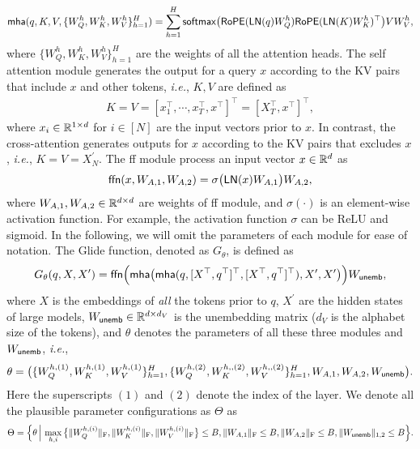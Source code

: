 \begin{align}
    \mathsf{mha}(q,K,V,\{W_Q^{h},W_K^{h},W_V^{h}\}_{h=1}^{H}) =  \sum_{h=1}^{H}\mathsf{softmax}\big(\mathsf{RoPE}(\mathsf{LN}(q) W_Q^{h}) \mathsf{RoPE}(\mathsf{LN}(K) W_K^{h})^{\top}\big)V W_{V}^{h},\label{eq:mha}
\end{align}
where $\{W_Q^{h},W_K^{h},W_V^{h}\}_{h=1}^{H}$ are the weights of all the attention heads. The self attention module generates the output for a query $x$ according to the KV pairs that include $x$ and other tokens, \emph{i.e.}, $K,V$ are defined as 
\begin{align*}
    K = V = [x_{1}^{\top},\cdots,x_{T}^{\top},x^{\top}]^{\top}=[X_{T}^{\top},x^{\top}]^{\top},
\end{align*}
where $x_{i}\in\mathbb{R}^{1\times d}$ for $i\in[N]$ are the input vectors prior to $x$. In contrast, the cross-attention generates outputs for $x$ according to the KV pairs that excludes $x$, \emph{i.e.}, $K=V=X_N^{\prime}$. The \ac{ff} module process an input vector $x\in\mathbb{R}^{d}$ as
\begin{align}
    \mathsf{ffn}(x,W_{A,1},W_{A,2})=\sigma\big(\mathsf{LN}(x)W_{A,1}\big)W_{A,2},
\end{align}
where $W_{A,1},W_{A,2}\in\mathbb{R}^{d\times d}$ are weights of \ac{ff} module, and $\sigma(\cdot)$ is an element-wise activation function. For example, the activation function $\sigma$ can be ReLU and sigmoid. In the following, we will omit the parameters of each module for ease of notation. The Glide function, denoted as $G_\theta$, is defined as
\begin{align}
    G_{\theta}(q,X,X^{\prime}) = \mathsf{ffn}\Big( \mathsf{mha}\big(\mathsf{mha}(q,[X^{\top},q^{\top}]^{\top}, [X^{\top},q^{\top}]^{\top}), X^{\prime},X^{\prime}\big)\Big)W_{\mathsf{unemb}},
\end{align}
where $X$ is the embeddings of \emph{all} the tokens prior to $q$, $X^{\prime}$ are the hidden states of large models, $W_{\mathsf{unemb}}\in\mathbb{R}^{d\times d_V}$ is the unembedding matrix ($d_V$ is the alphabet size of the tokens), and $\theta$ denotes the parameters of all these three modules and $W_{\mathsf{unemb}}$, \emph{i.e.},
\begin{align*}
    \theta= \big(\{W_Q^{h,(1)},W_K^{h,(1)},W_V^{h,(1)}\}_{h=1}^{H},\{W_Q^{h,(2)},W_K^{h,,(2)},W_V^{h,,(2)}\}_{h=1}^{H},W_{A,1},W_{A,2},W_{\mathsf{unemb}}\big).
\end{align*}
Here the superscripts $(1)$ and $(2)$ denote the index of the layer. We denote all the plausible parameter configurations as $\Theta$ as
\begin{align*}
    \Theta = \Big\{ \theta \,\Big|\, \max_{h,i}\big\{\|W_{Q}^{h,(i)}\|_{\mathrm{F}},\|W_{K}^{h,(i)}\|_{\mathrm{F}},\|W_{V}^{h,(i)}\|_{\mathrm{F}}\big\}\leq B, \| W_{A,1}\|_{\mathrm{F}}\leq B,  \| W_{A,2}\|_{\mathrm{F}}\leq B, \|W_{\mathsf{unemb}}\|_{1,2}\leq B \Big\}.
\end{align*}

